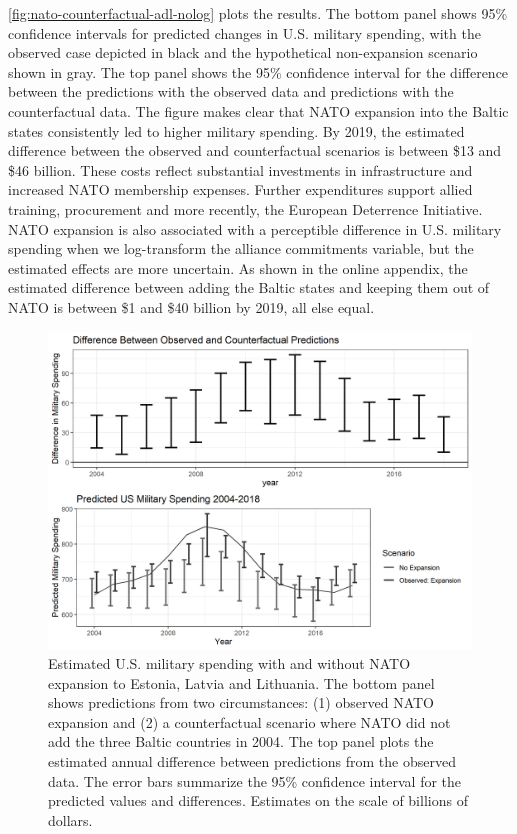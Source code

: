 \documentclass[12pt,hidelinks]{article}
\begin{document}
\autoref{fig:nato-counterfactual-adl-nolog} plots the results. 
The bottom panel shows 95\% confidence intervals for predicted changes in U.S. military spending, with the observed case depicted in black and the hypothetical non-expansion scenario shown in gray.
The top panel shows the 95\% confidence interval for the difference between the predictions with the observed data and predictions with the counterfactual data. 
The figure makes clear that NATO expansion into the Baltic states consistently led to higher military spending. 
By 2019, the estimated difference between the observed and counterfactual scenarios is between \$13 and \$46 billion. 
These costs reflect substantial investments in infrastructure and increased NATO membership expenses.\autocite{Moller2020}
Further expenditures support allied training, procurement and more recently, the European Deterrence Initiative.\autocite{CRS2020} 
NATO expansion is also associated with a perceptible difference in U.S. military spending when we log-transform the alliance commitments variable, but the estimated effects are more uncertain. 
As shown in the online appendix, the estimated difference between adding the Baltic states and keeping them out of NATO is between \$1 and \$40 billion by 2019, all else equal. 

\begin{figure} 
\includegraphics[width = .95\textwidth]{../figures/nato-counterfactual-adl-nolog.png}
\caption{Estimated U.S. military spending with and without NATO expansion to Estonia, Latvia and Lithuania. 
The bottom panel shows predictions from two circumstances: (1) observed NATO expansion and (2) a counterfactual scenario where NATO did not add the three Baltic countries in 2004. 
The top panel plots the estimated annual difference between predictions from the observed data. 
The error bars summarize the 95\% confidence interval for the predicted values and differences.
Estimates on the scale of billions of dollars.}
\label{fig:nato-counterfactual-adl-nolog}
\end{figure}
\end{document}
